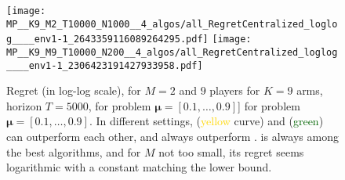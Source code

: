 \begin{figure}[!t]
  \centering
      \texttt{[image: MP\_\_K9\_M2\_T10000\_N1000\_\_4\_algos/all\_RegretCentralized\_loglog\_\_\_\_env1-1\_2643359116089264295.pdf]}
      \texttt{[image: MP\_\_K9\_M9\_T10000\_N200\_\_4\_algos/all\_RegretCentralized\_loglog\_\_\_\_env1-1\_2306423191427933958.pdf]}
  \caption[Regret for $M=2$ and $9$ players for $K=9$ arms, horizon $T=5000$, for a fixed problem]{Regret (in log-log scale), for $M=2$ and $9$ players for $K=9$ arms, horizon $T=5000$, for problem $\boldsymbol{\mu}=[0.1,\dots,0.9]$] for problem $\boldsymbol{\mu}=[0.1,\dots,0.9]$. In different settings, \RandTopM{} (\textcolor{gold}{yellow} curve) and \Selfish{} (\textcolor{darkgreen}{green}) can outperform each other, and always outperform \rhoRand. \MCTopM{} is always among the best algorithms, and for $M$ not too small, its regret seems logarithmic with a constant matching the lower bound.}
  \label{fig:5:MP__K9_M2-6-9_T10000_N200__4_algos}
\end{figure}







